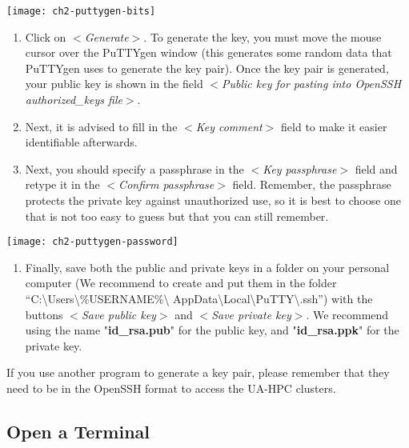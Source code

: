   \texttt{[image: ch2-puttygen-bits]}

  \begin{enumerate}
    \item  Click on $<$\textit{Generate}$>$. To generate the key, you must move
      the mouse cursor over the PuTTYgen window (this generates some random
      data that PuTTYgen uses to generate the key pair). Once the key pair is
      generated, your public key is shown in the field $<$\textit{Public key for pasting into OpenSSH authorized\_keys file}$>$.
    \item  Next, it is advised to fill in the $<$\textit{Key comment}$>$ field
      to make it easier identifiable afterwards.
    \item  Next, you should specify a passphrase in the $<$\textit{Key passphrase}$>$
      field and retype it in the $<$\textit{Confirm passphrase}$>$ field.
      Remember, the passphrase protects the private key against unauthorized
      use, so it is best to choose one that is not too easy to guess but that
      you can still remember.
  \end{enumerate}

  \texttt{[image: ch2-puttygen-password]}

  \begin{enumerate}
    \item  Finally, save both the public and private keys in a folder on your
      personal computer (We recommend to create and put them in the folder
      ``C:\textbackslash Users\textbackslash \%USERNAME\%\textbackslash
      AppData\textbackslash Local\textbackslash PuTTY\textbackslash .ssh'')
      with the buttons $<$\textit{Save public key}$>$ and $<$\textit{Save private key}$>$.
      We recommend using the name "\textbf{id\_rsa.pub}" for the public key,
      and "\textbf{id\_rsa.ppk}" for the private key.
  \end{enumerate}

  If you use another program to generate a key pair, please remember that they need to be in the OpenSSH format to access the UA-HPC clusters.

\fi



  \subsection{Open a Terminal}
  \label{subsec:open-a-terminal}

